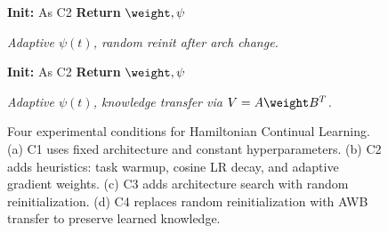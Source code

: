 \begin{figure}[!htb]
\begin{minipage}[t]{0.48\textwidth}
\begin{algorithm}[H]
\caption*{\textbf{(c) C3: Architecture Search}}
\label{alg:c3}
\textbf{Init:} As C2\;
{\bfseries Return} $\weight, \psi$\;
\end{algorithm}
\vspace{0.3em}
{\footnotesize \textit{Adaptive $\psi(t)$, random reinit after arch change.}}
\end{minipage}
\hfill
\begin{minipage}[t]{0.48\textwidth}
\begin{algorithm}[H]
\caption*{\textbf{(d) C4: AWB Full}}
\label{alg:c4}
\textbf{Init:} As C2\;
{\bfseries Return} $\weight, \psi$\;
\end{algorithm}
\vspace{0.3em}
{\footnotesize \textit{Adaptive $\psi(t)$, knowledge transfer via $V = A\weight B^T$.}}
\end{minipage}

\caption{Four experimental conditions for Hamiltonian Continual Learning. (a) C1 uses fixed architecture and constant hyperparameters. (b) C2 adds heuristics: task warmup, cosine LR decay, and adaptive gradient weights. (c) C3 adds architecture search with random reinitialization. (d) C4 replaces random reinitialization with AWB transfer to preserve learned knowledge.}
\label{fig:alg_conditions}
\end{figure}



